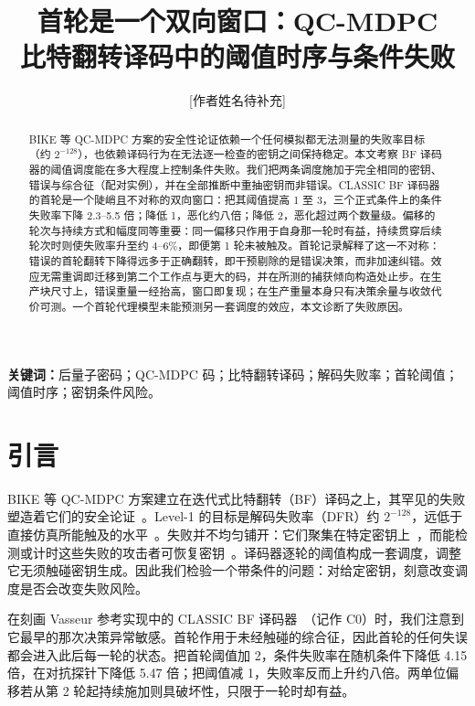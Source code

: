 \documentclass[UTF8,a4paper,10pt,onecolumn]{ctexart}
\title{\vspace{-1.2em}\heiti\zihao{3} 首轮是一个双向窗口：QC-MDPC\\比特翻转译码中的阈值时序与条件失败}
\author{\zihao{5} [作者姓名待补充]\\[0.2em]
\zihao{6}\mdseries [单位与通讯邮箱待补充]}
\date{}
\begin{document}
\sloppy

\maketitle

\begin{abstract}
BIKE 等 QC-MDPC 方案的安全性论证依赖一个任何模拟都无法测量的失败率目标（约 $2^{-128}$），也依赖译码行为在无法逐一检查的密钥之间保持稳定。本文考察 BF 译码器的阈值调度能在多大程度上控制条件失败。我们把两条调度施加于完全相同的密钥、错误与综合征（配对实例），并在全部推断中重抽密钥而非错误。CLASSIC BF 译码器的首轮是一个陡峭且不对称的双向窗口：把其阈值提高 1 至 3，三个正式条件上的条件失败率下降 2.3--5.5 倍；降低 1，恶化约八倍；降低 2，恶化超过两个数量级。偏移的轮次与持续方式和幅度同等重要：同一偏移只作用于自身那一轮时有益，持续贯穿后续轮次时则使失败率升至约 4--6\%，即便第 1 轮未被触及。首轮记录解释了这一不对称：错误的首轮翻转下降得远多于正确翻转，即干预剔除的是错误决策，而非加速纠错。效应无需重调即迁移到第二个工作点与更大的码，并在所测的捕获倾向构造处止步。在生产块尺寸上，错误重量一经抬高，窗口即复现；在生产重量本身只有决策余量与收敛代价可测。一个首轮代理模型未能预测另一套调度的效应，本文诊断了失败原因。
\end{abstract}

\vspace{0.6em}

\noindent\textbf{关键词：}后量子密码；QC-MDPC 码；比特翻转译码；解码失败率；首轮阈值；阈值时序；密钥条件风险。

\vspace{0.8em}

\section{引言}\label{sec:intro}

BIKE 等 QC-MDPC 方案建立在迭代式比特翻转（BF）译码之上，其罕见的失败塑造着它们的安全论证~\cite{misoczki2013mdpc,bike2024spec,alagic2025nist}。Level-1 的目标是解码失败率（DFR）约 $2^{-128}$，远低于直接仿真所能触及的水平~\cite{sendrier2019dfr,vasseur2021thesis}。失败并不均匀铺开：它们聚集在特定密钥上~\cite{guo2016key,wang2023weak,nosouhi2023weakkey}，而能检测或计时这些失败的攻击者可恢复密钥~\cite{eaton2018timing}。译码器逐轮的阈值构成一套调度，调整它无须触碰密钥生成。因此我们检验一个带条件的问题：对给定密钥，刻意改变调度是否会改变失败风险。

在刻画 Vasseur 参考实现中的 CLASSIC BF 译码器~\cite{vasseur2021thesis}（记作 C0）时，我们注意到它最早的那次决策异常敏感。首轮作用于未经触碰的综合征，因此首轮的任何失误都会进入此后每一轮的状态。把首轮阈值加 2，条件失败率在随机条件下降低 4.15 倍，在对抗探针下降低 5.47 倍；把阈值减 1，失败率反而上升约八倍。两单位偏移若从第 2 轮起持续施加则具破坏性，只限于一轮时却有益。
\end{document}

